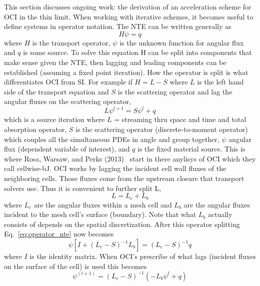 This section discusses ongoing work: the derivation of an acceleration scheme for OCI in the thin limit.
When working with iterative schemes, it becomes useful to define systems in operator notation.
The NTE can be written generally as
\begin{equation}
    H\psi = q
\end{equation}
where $H$ is the transport operator, $\psi$ is the unknown function for angular flux and $q$ is some source.
To solve this equation H can be split into components that make sense given the NTE, then lagging and leading components can be established (assuming a fixed point iteration).
How the operator is split is what differentiates OCI from SI.
For example if $H = L-S$ where $L$ is the left hand side of the transport equation and $S$ is the scattering operator and lag the angular fluxes on the scattering operator,
\begin{equation}
    L\psi^{l+1} = S\psi^l + q
\end{equation}
which is a source iteration where $L$ = streaming thru space and time and total absorption operator, %
$S$ is the scattering operator (discrete-to-moment operator) which couples all the simultaneous PDEs in angle and group together, %
$\psi$ angular flux (dependent variable of interest), and
$q$ is the fixed material source.
This is where Rosa, Warsaw, and Perks (2013)~\cite{rosa_cellwise_2013} start in there anylisys of OCI which they call cellwise-bJ.
OCI works by lagging the incident cell wall fluxes of the neighboring cells.
Those fluxes come from the upstream closure that transport solvers use.
Thus it is convenient to further split L,
\begin{equation}
    L = L_c + L_b
\end{equation}
where $L_c$ are the angular fluxes within a mesh cell and $L_b$ are the angular fluxes incident to the mesh cell's surface (boundary).
Note that what $L_b$ actually consists of depends on the spatial discretization.
After this operator splitting Eq.~\eqref{eq:operator_nte} now becomes
\begin{equation}
    \psi[I+(L_c-S)^{-1}L_b] = (L_c-S)^{-1}q
\end{equation}
where $I$ is the identity matrix.
When OCI's prescribe of what lags (incident fluxes on the surface of the cell) is used this becomes
\begin{equation}
    \label{eq:itter}
    \psi^{(l+1)} = (L_c-S)^{-1}(-L_b\psi^l+q)
\end{equation}

